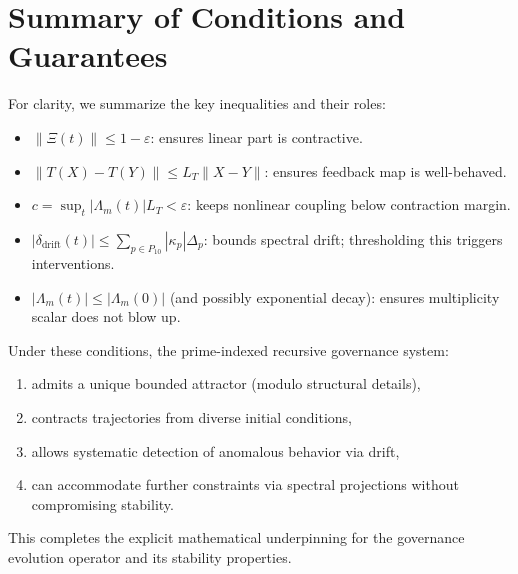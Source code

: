 \documentclass[11pt]{article}
\begin{document}
\section{Summary of Conditions and Guarantees}

For clarity, we summarize the key inequalities and their roles:

\begin{itemize}
  \item \(\|\Xi(t)\| \leq 1 - \varepsilon\): ensures linear part is contractive.
  \item \(\|T(X) - T(Y)\| \leq L_T \|X - Y\|\): ensures feedback map is well-behaved.
  \item \(c = \sup_t |\Lambda_m(t)| L_T < \varepsilon\): keeps nonlinear coupling below contraction margin.
  \item \(|\delta_{\text{drift}}(t)| \leq \sum_{p \in P_{10}} |\kappa_p| \Delta_p\): bounds spectral drift; thresholding this triggers interventions.
  \item \(|\Lambda_m(t)| \leq |\Lambda_m(0)|\) (and possibly exponential decay): ensures multiplicity scalar does not blow up.
\end{itemize}

Under these conditions, the prime-indexed recursive governance system:
\begin{enumerate}
  \item admits a unique bounded attractor (modulo structural details),
  \item contracts trajectories from diverse initial conditions,
  \item allows systematic detection of anomalous behavior via drift,
  \item can accommodate further constraints via spectral projections without compromising stability.
\end{enumerate}

This completes the explicit mathematical underpinning for the governance evolution operator and its stability properties.

\nocite{*}
  
  
\end{document}
